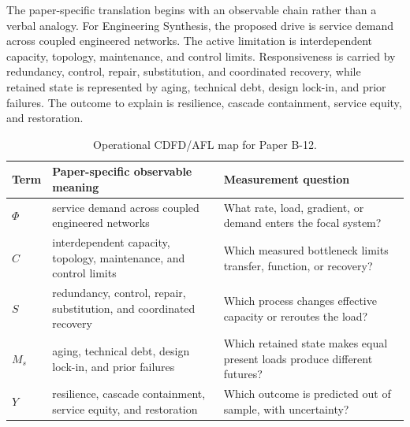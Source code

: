 \documentclass[12pt,a4paper]{article}
\begin{document}
The paper-specific translation begins with an observable chain rather than a
verbal analogy. For Engineering Synthesis, the proposed drive is service demand across coupled engineered networks.
The active limitation is interdependent capacity, topology, maintenance, and control limits. Responsiveness is carried by
redundancy, control, repair, substitution, and coordinated recovery, while retained state is represented by
aging, technical debt, design lock-in, and prior failures. The outcome to explain is resilience, cascade containment, service equity, and restoration.

\begin{table}[htbp]
\centering
\small
\caption{Operational CDFD/AFL map for Paper B-12.}
\begin{tabularx}{\textwidth}{|l|X|X|}
\hline
\textbf{Term} & \textbf{Paper-specific observable meaning} & \textbf{Measurement question} \\
\hline
$\Phi$ & service demand across coupled engineered networks & What rate, load, gradient, or demand enters the focal system? \\
\hline
$C$ & interdependent capacity, topology, maintenance, and control limits & Which measured bottleneck limits transfer, function, or recovery? \\
\hline
$S$ & redundancy, control, repair, substitution, and coordinated recovery & Which process changes effective capacity or reroutes the load? \\
\hline
$M_s$ & aging, technical debt, design lock-in, and prior failures & Which retained state makes equal present loads produce different futures? \\
\hline
$Y$ & resilience, cascade containment, service equity, and restoration & Which outcome is predicted out of sample, with uncertainty? \\
\hline
\end{tabularx}
\end{table}
\end{document}
